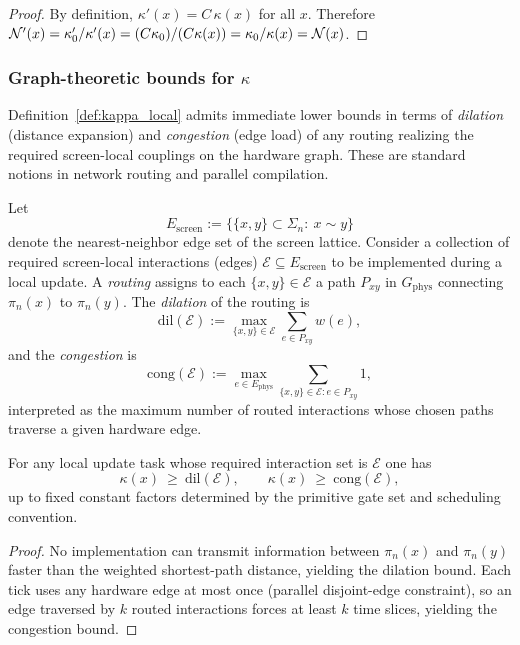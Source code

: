 \begin{proof}
By definition, $\kappa'(x)=C\,\kappa(x)$ for all $x$.
Therefore $\mathcal{N}'(x)=\kappa_0'/\kappa'(x)=(C\kappa_0)/(C\kappa(x))=\kappa_0/\kappa(x)=\mathcal{N}(x)$.
\end{proof}

\subsubsection{Graph-theoretic bounds for \texorpdfstring{$\kappa$}{kappa}}
\label{sec:kappa_bounds}

Definition~\ref{def:kappa_local} admits immediate lower bounds in terms of \emph{dilation} (distance expansion) and \emph{congestion} (edge load) of any routing realizing the required screen-local couplings on the hardware graph.
These are standard notions in network routing and parallel compilation.

\begin{definition}
\label{def:dilation_congestion}
Let
\[
E_{\mathrm{screen}}
:=\bigl\{\{x,y\}\subset\Sigma_n:\ x\sim y\bigr\}
\]
denote the nearest-neighbor edge set of the screen lattice.
Consider a collection of required screen-local interactions (edges) $\mathcal{E}\subseteq E_{\mathrm{screen}}$ to be implemented during a local update.
A \emph{routing} assigns to each $\{x,y\}\in\mathcal{E}$ a path $P_{xy}$ in $G_{\mathrm{phys}}$ connecting $\pi_n(x)$ to $\pi_n(y)$.
The \emph{dilation} of the routing is
\[
\mathrm{dil}(\mathcal{E}):=\max_{\{x,y\}\in\mathcal{E}} \sum_{e\in P_{xy}} w(e),
\]
and the \emph{congestion} is
\[
\mathrm{cong}(\mathcal{E}):=\max_{e\in E_{\mathrm{phys}}} \sum_{\{x,y\}\in\mathcal{E}: e\in P_{xy}} 1,
\]
interpreted as the maximum number of routed interactions whose chosen paths traverse a given hardware edge.
\end{definition}

\begin{proposition}
\label{prop:kappa_lower_bounds}
For any local update task whose required interaction set is $\mathcal{E}$ one has
\[
\kappa(x)\ \ge\ \mathrm{dil}(\mathcal{E}),
\qquad
\kappa(x)\ \ge\ \mathrm{cong}(\mathcal{E}),
\]
up to fixed constant factors determined by the primitive gate set and scheduling convention.
\end{proposition}

\begin{proof}
No implementation can transmit information between $\pi_n(x)$ and $\pi_n(y)$ faster than the weighted shortest-path distance, yielding the dilation bound.
Each tick uses any hardware edge at most once (parallel disjoint-edge constraint), so an edge traversed by $k$ routed interactions forces at least $k$ time slices, yielding the congestion bound.
\end{proof}

